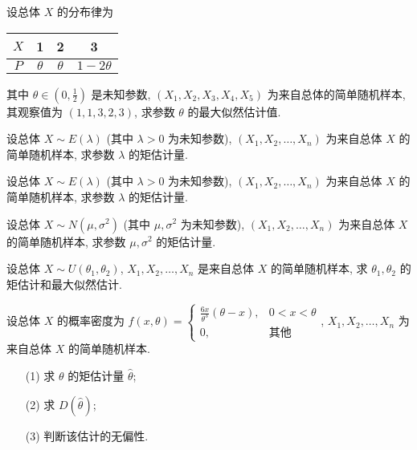 \documentclass[padp]{ExBook}
\begin{document}
\begin{qitems}
    \begin{bbox}
        \qitem   设总体 $X$ 的分布律为
\begin{center}
\begin{tabular}{|c|c|c|c|}
\hline
$X$ & 1 & 2 & 3 \\
\hline
$P$ & $\theta$ & $\theta$ & $1-2\theta$ \\
\hline
\end{tabular}
\end{center}
其中 $\theta \in (0, \frac{1}{2})$ 是未知参数, $(X_1, X_2, X_3, X_4, X_5)$ 为来自总体的简单随机样本, 其观察值为 $(1, 1, 3, 2, 3)$, 求参数 $\theta$ 的最大似然估计值.
    \end{bbox}
    \begin{bbox}
        \qitem  设总体 $X \sim E(\lambda)$ (其中 $\lambda > 0$ 为未知参数), $(X_1, X_2, \dots, X_n)$ 为来自总体 $X$ 的简单随机样本, 求参数 $\lambda$ 的矩估计量. 
    \end{bbox}
    \begin{bbox}
        \qitem  设总体 $X \sim E(\lambda)$ (其中 $\lambda > 0$ 为未知参数), $(X_1, X_2, \dots, X_n)$ 为来自总体 $X$ 的简单随机样本, 求参数 $\lambda$ 的矩估计量.
    \end{bbox}
    \begin{bbox}
        \qitem   设总体 $X \sim N(\mu, \sigma^2)$ (其中 $\mu, \sigma^2$ 为未知参数), $(X_1, X_2, \dots, X_n)$ 为来自总体 $X$ 的简单随机样本, 求参数 $\mu, \sigma^2$ 的矩估计量. 
    \end{bbox}
    \begin{bbox}
        \qitem   设总体 $X \sim U(\theta_1, \theta_2)$, $X_1, X_2, \dots, X_n$ 是来自总体 $X$ 的简单随机样本, 求 $\theta_1, \theta_2$ 的矩估计和最大似然估计.
    \end{bbox}
    \begin{bbox}
        \qitem   设总体 $X$ 的概率密度为 $f(x, \theta) = 
\begin{cases}
\frac{6x}{\theta^3}(\theta-x), & 0 < x < \theta \\
0, & \text{其他}
\end{cases}
$, $X_1, X_2, \dots, X_n$ 为来自总体 $X$ 的简单随机样本.
\begin{enumerate}
    \item[(1)] 求 $\theta$ 的矩估计量 $\hat{\theta}$;
    \item[(2)] 求 $D(\hat{\theta})$;
    \item[(3)] 判断该估计的无偏性.
\end{enumerate}
    \end{bbox}

\end{qitems}
\end{document}
